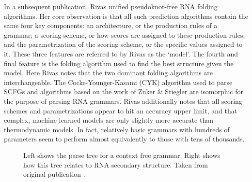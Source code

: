 \documentclass[12pt, a4paper]{article}
\begin{document}
In a subsequent publication, Rivas \cite{rivas2013four} unified pseudoknot-free RNA folding algorithms. Her core observation is that all such prediction algorithms contain the same four key components: an architecture, or the production rules of a grammar; a scoring scheme, or how scores are assigned to these production rules; and the parametrization of the scoring scheme, or the specific values assigned to it. These three features are referred to by Rivas as the `model'. The fourth and final feature is the folding algorithm used to find the best structure given the model. Here Rivas notes that the two dominant folding algorithms are interchangeable. The Cocke-Younger-Kasami (CYK) algorithm used to parse SCFGs and algorithms based on the work of Zuker \& Stiegler are isomorphic for the purpose of parsing RNA grammars. Rivas additionally notes that all scoring schemes and parametrizations appear to hit an accuracy upper limit, and that complex, machine learned models are only slightly more accurate than thermodynamic models. In fact, relatively basic grammars with hundreds of parameters seem to perform almost equivalently to those with tens of thousands.

\begin{figure}
\begin{center}
\end{center}
\caption{Left shows the parse tree for a context free grammar. Right shows how this tree relates to RNA secondary structure. Taken from original publication \cite{sakakibara1994stochastic}.}
\label{fig:scfg}
\end{figure}
\end{document}
